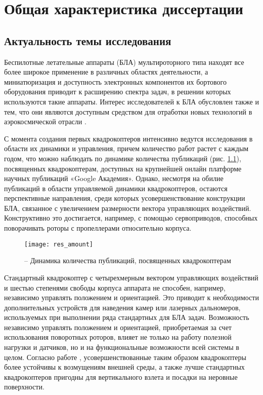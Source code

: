 
\chapter{Общая характеристика диссертации}

\section{Актуальность темы исследования}

Беспилотные летательные аппараты (БЛА) мультироторного типа находят все более широкое применение в различных областях деятельности, а миниатюризация и доступность электронных компонентов их бортового оборудования приводит к расширению спектра задач, в решении которых используются такие аппараты.
Интерес исследователей к БЛА обусловлен также и тем, что они являются доступным средством для отработки новых технологий в аэрокосмической отрасли \cite{Otero01}.

С момента создания первых квадрокоптеров интенсивно ведутся исследования в области их динамики и управления, причем количество работ растет с каждым годом, что можно наблюдать по динамике количества публикаций (рис. \ref{pic:res_amount}), посвященных квадрокоптерам, доступных на крупнейшей онлайн платформе научных публикаций «Google Академия».
Однако, несмотря на обилие публикаций в области управляемой динамики квадрокоптеров, остаются перспективные направления, среди которых усовершенствование конструкции БЛА, связанное с увеличением размерности вектора управляющих воздействий.
Конструктивно это достигается, например, с помощью сервоприводов, способных поворачивать роторы с пропеллерами относительно корпуса.
\begin{figure}[h!]
	\centering
	\texttt{[image: res\_amount]}
	\caption{ -- Динамика количества публикаций, посвященных квадрокоптерам}
	\label{pic:res_amount}
\end{figure}
{
	\vskip 5mm
}

Стандартный квадрокоптер с четырехмерным вектором управляющих воздействий и шестью степенями свободы корпуса аппарата не способен, например, независимо управлять положением и ориентацией.
Это приводит к необходимости дополнительных устройств для наведения камер или лазерных дальномеров, используемых при выполнении ряда стандартных для БЛА задач.
Возможность независимо управлять положением и ориентацией, приобретаемая за счет использования поворотных роторов, влияет не только на работу полезной нагрузки и датчиков, но и на функциональные возможности всей системы в целом.
Согласно работе \cite{Stolc01}, усовершенствованные таким образом квадрокоптеры более устойчивы к возмущениям внешней среды, а также лучше стандартных квадрокоптеров пригодны для вертикального взлета и посадки на неровные поверхности.

